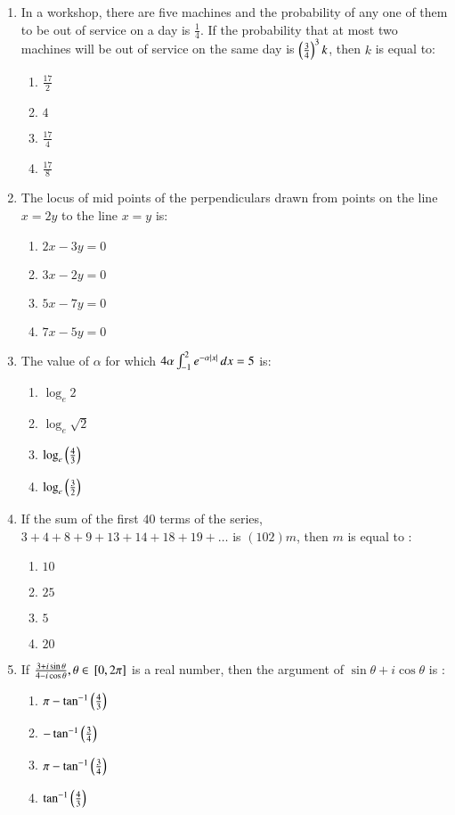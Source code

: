 \documentclass[journal,12pt,twocolumn]{IEEEtran}
\theoremstyle{remark}
\begin{document}
\begin{enumerate}
    \item In a workshop, there are five machines and the probability of any one of them to be out of service on a day is $\frac{1}{4}$. If the probability that at most two machines will be out of service on the same day is $\left(\frac{3}{4}\right)^3k$, then $k$ is equal to:
        \begin{enumerate}
            \item $\frac{17}{2}$
            \item $4$
            \item $\frac{17}{4}$
            \item $\frac{17}{8}$
        \end{enumerate}

    \item The locus of mid points of the perpendiculars drawn from points on the line $x=2y$ to the line $x=y$ is:
        \begin{enumerate}
            \item $2x-3y=0$
            \item $3x-2y=0$
            \item $5x-7y=0$
            \item $7x-5y=0$
        \end{enumerate}

    \item The value of $\alpha$ for which $4\alpha\int_{-1}^{2}e^{-\alpha\left\vert x\right\vert}\,dx=5$ is: 
        \begin{enumerate}
            \item $\log_e2$
            \item $\log_e\sqrt{2}$
            \item $\log_e\left(\frac{4}{3}\right)$
            \item $\log_e\left(\frac{3}{2}\right)$
        \end{enumerate}

    \item If the sum of the first $40$ terms of the series, $3 + 4 + 8 + 9 + 13 + 14 + 18 + 19 + \dots$ is $(102)m$, then $m$ is equal to :
        \begin{enumerate}
            \item $10$
            \item $25$
            \item $5$
            \item $20$
        \end{enumerate}

    \item If $\frac{3+i\sin\theta}{4-i\cos\theta}, \theta\in{}\left[0,2\pi\right]$ is a real number, then the argument of $\sin\theta+i\cos\theta$ is :
        \begin{enumerate}
            \item $\pi-\tan^{-1}\left(\frac{4}{3}\right)$
            \item $-\tan^{-1}\left(\frac{3}{4}\right)$
            \item $\pi-\tan^{-1}\left(\frac{3}{4}\right)$
            \item $\tan^{-1}\left(\frac{4}{3}\right)$
        \end{enumerate}


\end{enumerate}
\end{document}
